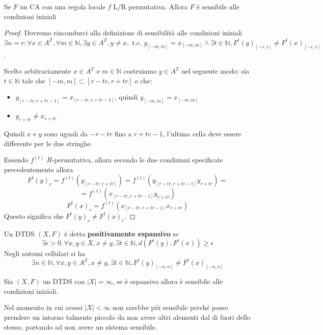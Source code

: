 \begin{nota}
    Se $F$ un CA con una regola locale $f$ L/R permutativa. Allora $F$ è sensibile 
    alle condizioni iniziali
    \begin{proof}
        Dovremo rincondurci alla definizione di sensibilità alle condizioni iniziali
        $\exists n=r: \forall x\in A^\mathbb{Z}, \forall m\in \mathbb{N},
        \exists y \in A^\mathbb{Z}, y\ne x, \text{ t.c. } y_{[-m,m]} = x_{[-m,m]}\land 
        \exists t\in \mathbb{N},F^t(y)_{[-r,r]} \ne F^t(x)_{[-r,r]}$.

        Scelto arbitrariamente $x\in A^\mathbb{Z}$ e $m\in \mathbb{N}$ costruiamo
        $y\in A^\mathbb{Z}$ nel seguente modo: sia $t\in\mathbb{N}$ tale che 
        $[-m,m]\subset [r-tr,r+tr]$ e che:
        \begin{itemize}
            \item $y_{[r-tr, r+tr-1]} = x_{[r-tr, r+tr-1]}$, quindi $y_{[-m,m]} = x_{[-m,m]}$
            \item $y_{r+tr} \ne x_{r+tr}$
        \end{itemize} 
        Quindi $x$ e $y$ sono uguali da $-r-tr$ fino a $r+tr-1$, l'ultima cella 
        deve essere differente per le due stringhe.

        Essendo $f^{(t)}$ $R$-permutativa, allora secondo le due condizioni 
        specificate precedentemente allora 
        $$F^t(y)_r=f^{(t)}(y_{[r-tr, r+tr]})=f^{(t)}(y_{[r-tr, r+tr-1]}y_{r+tr})=$$
        $$=f^{(t)}(x_{[r-tr, r+tr-1]}y_{r+tr})$$
        $$F^t(x)_r=f^{(t)}(x_{[r-tr, r+tr-1]}x_{r+tr}) $$
        Questo significa che $F^t(y)_r \ne F^t(x)_r$.
    \end{proof}
\end{nota}

\begin{definizione}
    Un DTDS $(X,F)$ è detto \textbf{positivamente espansivo} se 
    $$\exists \epsilon >0, \forall x,y\in X, x\ne y, \exists t\in \mathbb{N}, d(F^t(y),F^t(x))\ge \epsilon$$
    Negli automi cellulari si ha
    $$\exists n\in \mathbb{N}, \forall x,y\in A^\mathbb{Z}, x\ne y, \exists t\in \mathbb{N}, F^t(y)_{[-n,n]} \ne F^t(x)_{[-n,n]}$$
\end{definizione}

\begin{teorema}
    Sia $(X,F)$ un DTDS con $|X|=\infty$, se è espansivo allora è sensibile alle condizioni iniziali.

    Nel momento in cui avessi $|X|<\infty$ non sarebbe più sensibile perché posso
    prendere un intorno talmente piccolo da non avere altri alementi dal di fuori 
    dello stesso, portando ad non avere un sistema sensibile. 
\end{teorema}


